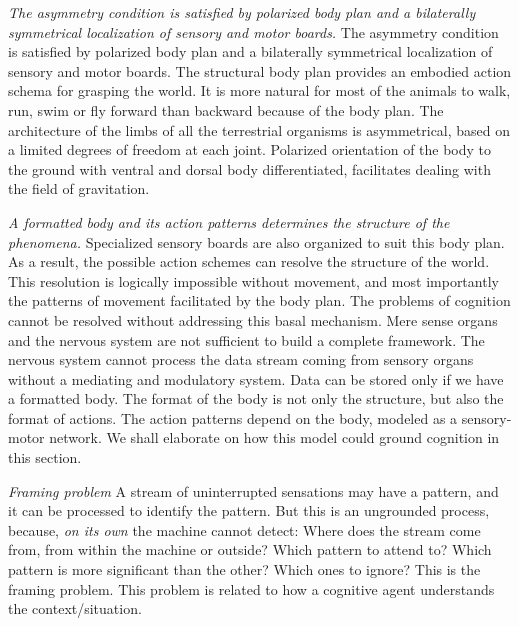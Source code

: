 {{{{{\emph{The asymmetry condition is satisfied by polarized body plan and a bilaterally symmetrical localization of sensory and motor boards.} The asymmetry condition is satisfied by polarized body plan and a bilaterally symmetrical localization of sensory and motor boards. 
The structural body plan provides an embodied action schema for grasping the world. It is more natural for most of the animals to walk, run, swim or fly forward than backward because of the body plan. The architecture of the limbs of all the terrestrial organisms is asymmetrical, based on a limited degrees of freedom at each joint. Polarized orientation of the body to the ground with ventral and dorsal body differentiated, facilitates dealing with the field of gravitation. 

\emph{A formatted body and its action patterns determines the structure of the phenomena.} Specialized sensory boards are also organized to suit this body plan. As a result, the possible action schemes can resolve the structure of the world. This resolution is logically impossible without movement, and most importantly the patterns of movement facilitated by the body plan. The problems of cognition cannot be resolved without addressing this basal mechanism. Mere sense organs and the nervous system are not sufficient to build a complete framework. The nervous system cannot process the data stream coming from sensory organs without a mediating and modulatory system. Data can be stored only if we have a formatted body. The format of the body is not only the structure, but also the format of actions. The action patterns depend on the body, modeled as a sensory-motor network.  We shall elaborate on how this model could ground cognition in this section.

\emph{Framing problem} A stream of uninterrupted sensations may have a pattern, and it can be processed to identify the pattern. But this is an ungrounded process, because, \textit{on its own} the machine cannot detect: Where does the stream come from, from within the machine or outside? Which pattern to attend to? Which pattern is more significant than the other? Which ones to ignore? This is the framing problem. This problem is related to how a cognitive agent understands the context/situation. 

}}}}}
